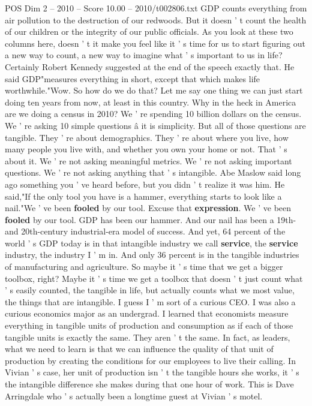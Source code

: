 \begin{textsample}{POS Dim 2 – 2010 – Score 10.00 – 2010/t002806.txt}
GDP counts everything from air pollution to the destruction of our redwoods.
But it doesn ' t count the health of our children or the integrity of our public officials.
As you look at these two columns here, doesn ' t it make you feel like it ' s time for us to start figuring out a new way to count, a new way to imagine what ' s important to us in life?
Certainly Robert Kennedy suggested at the end of the speech exactly that.
He said GDP"measures everything in short, except that which makes life worthwhile."Wow.
So how do we do that?
Let me say one thing we can just start doing ten years from now, at least in this country.
Why in the heck in America are we doing a census in 2010?
We ' re spending 10 billion dollars on the census.
We ' re asking 10 simple questions â it is simplicity.
But all of those questions are tangible.
They ' re about demographics.
They ' re about where you live, how many people you live with, and whether you own your home or not.
That ' s about it.
We ' re not asking meaningful metrics.
We ' re not asking important questions.
We ' re not asking anything that ' s intangible.
Abe Maslow said long ago something you ' ve heard before, but you didn ' t realize it was him.
He said,"If the only tool you have is a hammer, everything starts to look like a nail."We ' ve been \textbf{fooled} by our tool.
Excuse that \textbf{expression}.
We ' ve been \textbf{fooled} by our tool.
GDP has been our hammer.
And our nail has been a 19th- and 20th-century industrial-era model of success.
And yet, 64 percent of the world ' s GDP today is in that intangible industry we call \textbf{service}, the \textbf{service} industry, the industry I ' m in.
And only 36 percent is in the tangible industries of manufacturing and agriculture.
So maybe it ' s time that we get a bigger toolbox, right?
Maybe it ' s time we get a toolbox that doesn ' t just count what ' s easily counted, the tangible in life, but actually counts what we most value, the things that are intangible.
I guess I ' m sort of a curious CEO.
I was also a curious economics major as an undergrad.
I learned that economists measure everything in tangible units of production and consumption as if each of those tangible units is exactly the same.
They aren ' t the same.
In fact, as leaders, what we need to learn is that we can influence the quality of that unit of production by creating the conditions for our employees to live their calling.
In Vivian ' s case, her unit of production isn ' t the tangible hours she works, it ' s the intangible difference she makes during that one hour of work.
This is Dave Arringdale who ' s actually been a longtime guest at Vivian ' s motel.

\end{textsample}
